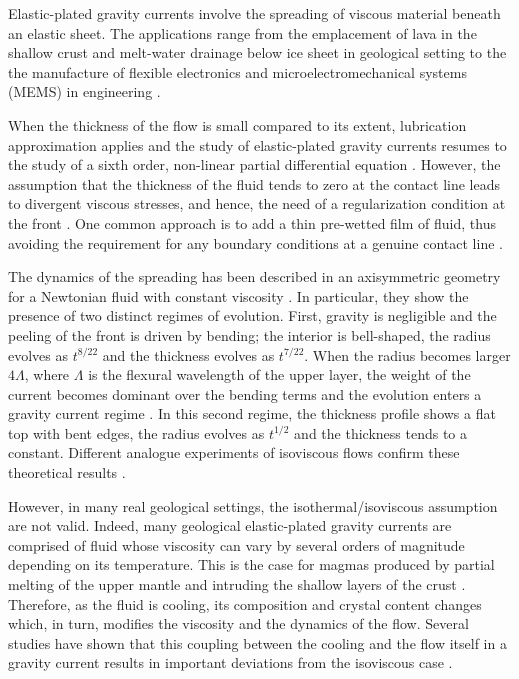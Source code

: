 Elastic-plated  gravity  currents  involve the  spreading  of  viscous
material beneath  an elastic  sheet. The  applications range  from the
emplacement      of      lava      in      the      shallow      crust
\citep{Michaut:2011kg,Bunger:2011cb} and melt-water drainage below ice
sheet \citep{Das:2008in,Tsai:2010ev} in geological  setting to the the
manufacture of flexible electronics and microelectromechanical systems
(MEMS) in engineering \citep{Hosoi:2004dn}.

When  the thickness  of  the flow  is small  compared  to its  extent,
lubrication  approximation applies  and  the  study of  elastic-plated
gravity currents  resumes to  the study of  a sixth  order, non-linear
partial                      differential                     equation
\citep{Michaut:2011kg,Lister:2013ia,Anonymous:QWXp_4JV}   .   However,
the assumption  that the thickness of  the fluid tends to  zero at the
contact line leads to divergent  viscous stresses, and hence, the need
of      a     regularization      condition      at     the      front
\citep{Flitton:1999iv,Lister:2013ia,Anonymous:QWXp_4JV}.   One  common
approach is to add a thin  pre-wetted film of fluid, thus avoiding the
requirement  for any  boundary conditions  at a  genuine contact  line
\citep{Lister:2013ia,Anonymous:QWXp_4JV}.

The dynamics  of the spreading  has been described in  an axisymmetric
geometry   for    a   Newtonian   fluid   with    constant   viscosity
\citep{Michaut:2011kg,Lister:2013ia,Thorey:2014cv}.    In  particular,
they show the  presence of two distinct regimes  of evolution.  First,
gravity  is negligible  and  the peeling  of the  front  is driven  by
bending; the interior is bell-shaped, the radius evolves as $t^{8/22}$
and  the thickness  evolves as  $t^{7/22}$.  When  the radius  becomes
larger $4\Lambda$, where  $\Lambda$ is the flexural  wavelength of the
upper  layer, the  weight of  the  current becomes  dominant over  the
bending  terms  and the  evolution  enters  a gravity  current  regime
\citep{Huppert:1982a}. In  this second  regime, the  thickness profile
shows a flat top with bent  edges, the radius evolves as $t^{1/2}$ and
the thickness tends to a  constant.  Different analogue experiments of
isoviscous     flows     confirm      these     theoretical     results
\citep{Dixon:1987js,Lister:2013ia}.

However, in  many real geological settings,  the isothermal/isoviscous
assumption  are not  valid.   Indeed,  many geological  elastic-plated
gravity currents  are comprised of  fluid whose viscosity can  vary by
several orders of magnitude depending on its temperature.  This is the
case for  magmas produced by partial  melting of the upper  mantle and
intruding      the      shallow      layers     of      the      crust
\citep{Anonymous:CZVBrBvv,Lejeune:1995fc}.  Therefore, as the fluid is
cooling, its composition  and crystal content changes  which, in turn,
modifies the  viscosity and  the dynamics  of the  flow.  Several
studies have shown that this coupling between the cooling and the flow
itself in a  gravity current results in important  deviations from the
isoviscous                                                        case
\citep{Bercovici:2007vc,BALMFORTH:1999ey,Garel:2014era}.

